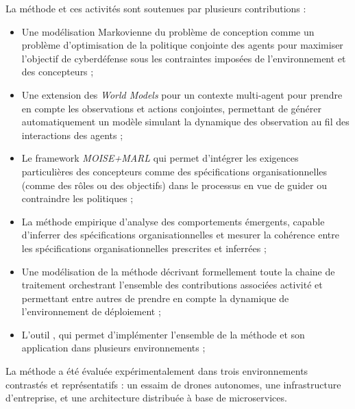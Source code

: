 La méthode et ces activités sont soutenues par plusieurs contributions :
\begin{itemize}
    \item Une modélisation Markovienne du problème de conception comme un problème d'optimisation de la politique conjointe des agents pour maximiser l'objectif de cyberdéfense sous les contraintes imposées de l'environnement et des concepteurs ;
    \item Une extension des \textit{World Models} pour un contexte multi-agent pour prendre en compte les observations et actions conjointes, permettant de générer automatiquement un modèle simulant la dynamique des observation au fil des interactions des agents ;
    \item Le framework \textit{MOISE+MARL} qui permet d'intégrer les exigences particulières des concepteurs comme des spécifications organisationnelles (comme des rôles ou des objectifs) dans le processus  en vue de guider ou contraindre les politiques ;
    \item La méthode empirique  d'analyse des comportements émergents, capable d'inferrer des spécifications organisationnelles et mesurer la cohérence entre les spécifications organisationnelles prescrites et inferrées ;
    \item Une modélisation de la méthode  décrivant formellement toute la chaine de traitement orchestrant l'ensemble des contributions associées activité et permettant entre autres de prendre en compte la dynamique de l'environnement de déploiement ;
    \item L'outil , qui permet d'implémenter l'ensemble de la méthode  et son application dans plusieurs environnements ;
\end{itemize}

La méthode  a été évaluée expérimentalement dans trois environnements contrastés et représentatifs : un essaim de drones autonomes, une infrastructure d'entreprise, et une architecture distribuée à base de microservices.

\

\bigskip

\\


